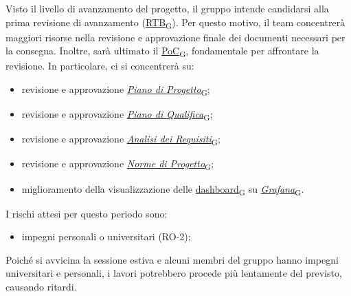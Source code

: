 Visto il livello di avanzamento del progetto, il gruppo intende candidarsi alla prima revisione di avanzamento (\href{https://7last.github.io/docs/rtb/documentazione-interna/glossario\#requirements-and-technology-baseline}{RTB\textsubscript{G}}). Per questo motivo, il team concentrerà maggiori risorse nella revisione e approvazione finale dei documenti necessari per la consegna. Inoltre, sarà ultimato il \href{https://7last.github.io/docs/rtb/documentazione-interna/glossario\#proof-of-concept}{PoC\textsubscript{G}}, fondamentale per affrontare la revisione. In particolare, ci si concentrerà su:
\begin{itemize}
	\item revisione e approvazione \href{https://7last.github.io/docs/rtb/documentazione-interna/glossario\#piano-di-progetto}{\textit{Piano di Progetto}\textsubscript{G}};
	\item revisione e approvazione \href{https://7last.github.io/docs/rtb/documentazione-interna/glossario\#piano-di-qualifica}{\textit{Piano di Qualifica}\textsubscript{G}};
	\item revisione e approvazione \href{https://7last.github.io/docs/rtb/documentazione-interna/glossario\#analisi-dei-requisiti}{\textit{Analisi dei Requisiti}\textsubscript{G}};
	\item revisione e approvazione \href{https://7last.github.io/docs/rtb/documentazione-interna/glossario\#norme-di-progetto}{\textit{Norme di Progetto}\textsubscript{G}};
	\item miglioramento della visualizzazione delle \href{https://7last.github.io/docs/rtb/documentazione-interna/glossario\#dashboard}{dashboard\textsubscript{G}} su \href{https://7last.github.io/docs/rtb/documentazione-interna/glossario\#grafana}{\textit{Grafana}\textsubscript{G}}.
\end{itemize}

\newpage

I rischi attesi per questo periodo sono:
\begin{itemize}
    \item impegni personali o universitari (RO-2);
\end{itemize}
Poiché si avvicina la sessione estiva e alcuni membri del gruppo hanno impegni universitari e personali, i lavori potrebbero procede più lentamente del previsto, causando ritardi.

